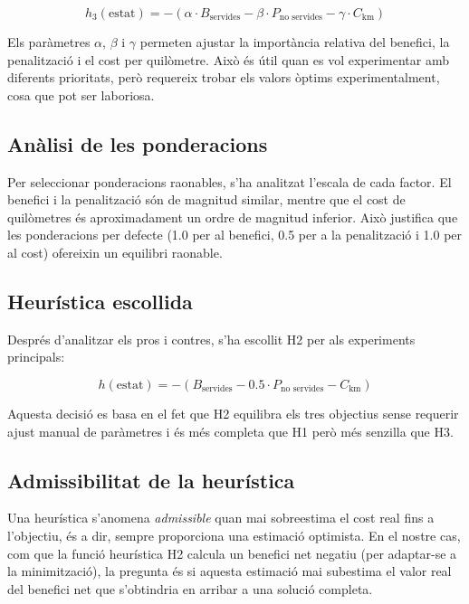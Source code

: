 \begin{equation}
h_3(\text{estat}) = -(\alpha \cdot B_{\text{servides}} - \beta \cdot P_{\text{no servides}} - \gamma \cdot C_{\text{km}})
\end{equation}

Els paràmetres $\alpha$, $\beta$ i $\gamma$ permeten ajustar la importància relativa del benefici, la penalització i el cost per quilòmetre. Això és útil quan es vol experimentar amb diferents prioritats, però requereix trobar els valors òptims experimentalment, cosa que pot ser laboriosa.

\subsection{Anàlisi de les ponderacions}

Per seleccionar ponderacions raonables, s’ha analitzat l’escala de cada factor. El benefici i la penalització són de magnitud similar, mentre que el cost de quilòmetres és aproximadament un ordre de magnitud inferior. Això justifica que les ponderacions per defecte (1.0 per al benefici, 0.5 per a la penalització i 1.0 per al cost) ofereixin un equilibri raonable.

\subsection{Heurística escollida}

Després d’analitzar els pros i contres, s’ha escollit H2 per als experiments principals:

\begin{equation}
h(\text{estat}) = -(B_{\text{servides}} - 0.5 \cdot P_{\text{no servides}} - C_{\text{km}})
\end{equation}

Aquesta decisió es basa en el fet que H2 equilibra els tres objectius sense requerir ajust manual de paràmetres i és més completa que H1 però més senzilla que H3.
\subsection{Admissibilitat de la heurística}

Una heurística s’anomena \textit{admissible} quan mai sobreestima el cost real fins a l’objectiu, és a dir, sempre proporciona una estimació optimista. En el nostre cas, com que la funció heurística H2 calcula un benefici net negatiu (per adaptar-se a la minimització), la pregunta és si aquesta estimació mai subestima el valor real del benefici net que s’obtindria en arribar a una solució completa.

